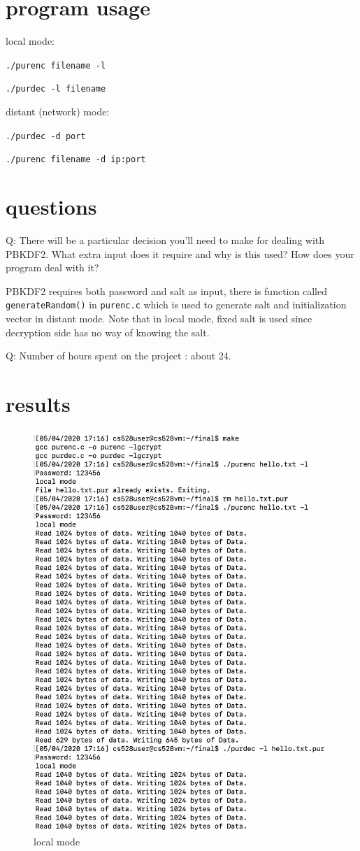 \documentclass[11pt, oneside]{article}   	%
\begin{document}
\section{program usage}
local mode:

\verb|./purenc filename -l|

\verb|./purdec -l filename|

distant (network) mode:

\verb|./purdec -d port|

\verb|./purenc filename -d ip:port|

\section{questions}
Q: There will be a particular decision you’ll need to make for dealing with PBKDF2. What extra input does it require and why is this used? How does your program deal with it?

PBKDF2 requires both password and salt as input, there is function called \texttt{generateRandom()} in \texttt{purenc.c} which is used to generate salt and initialization vector in distant mode. Note that in local mode, fixed salt is used since decryption side has no way of knowing the salt.


Q: Number of hours spent on the project : about 24.

\section{results}
\begin{figure}[htbp]
   \centering
   \includegraphics[scale = 0.7]{local.png} %
   \caption{local mode}
   \label{fig:example}
\end{figure}
\end{document}
